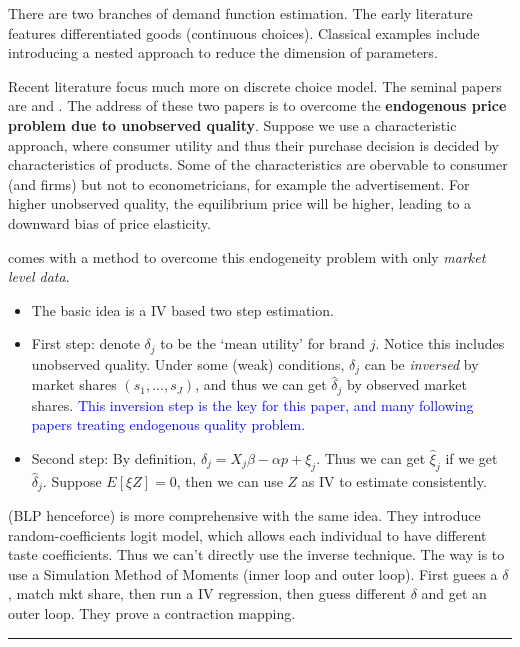 \documentclass{book}
\theoremstyle{plain}
\theoremstyle{definition}
\newcommand{\myline}{\vspace{3mm} \hrule \vspace{4mm}}
\begin{document}
There are two branches of demand function estimation.
The early literature features differentiated goods (continuous choices). Classical examples include \cite{Hausman:1994km} introducing a nested approach to reduce the dimension of parameters.

Recent literature focus much more on discrete choice model. The seminal papers are \cite{Berry:1994jh} and \cite*{berry.et.al.1995.emca}.
The address of these two papers is to overcome the \textbf{endogenous price problem due to unobserved quality}. 
Suppose we use a characteristic approach, where consumer utility and thus their purchase decision is decided by characteristics of products. 
Some of the characteristics are obervable to consumer (and firms) but not to econometricians, for example the advertisement. 
For higher unobserved quality, the equilibrium price will be higher, leading to a downward bias of price elasticity.

\cite{Berry:1994jh} comes with a method to overcome this endogeneity problem with only \textit{market level data}.
\begin{itemize}
	\setlength{\itemsep}{0pt}
	\item The basic idea is a IV based two step estimation.
	\item First step: denote $\delta_j$ to be the `mean utility' for brand $j$. Notice this includes unobserved quality. Under some (weak) conditions, $\delta_j$ can be \textit{inversed} by market shares $(s_1,...,s_J)$, and thus we can get $\hat \delta_j$ by observed market shares. 
	\textcolor{blue}{This inversion step is the key for this paper, and many following papers treating endogenous quality problem.}
	\item Second step: By definition, $\delta_j=X_j\beta -\alpha p +\xi_j$. Thus we can get $\hat \xi_j$ if we get $\hat \delta_j$. Suppose $E[\xi Z]=0$, then we can use $Z$ as IV to estimate consistently.
\end{itemize}

\cite{berry.et.al.1995.emca} (BLP henceforce) is more comprehensive with the same idea. They introduce random-coefficients logit model, which allows each individual to have different taste coefficients. Thus we can't directly use the inverse technique. The way is to use a Simulation Method of Moments (inner loop and outer loop). First guees a $\delta$, match mkt share, then run a IV regression, then guess different $\delta$ and get an outer loop. They prove a contraction mapping.

\myline
\end{document}
